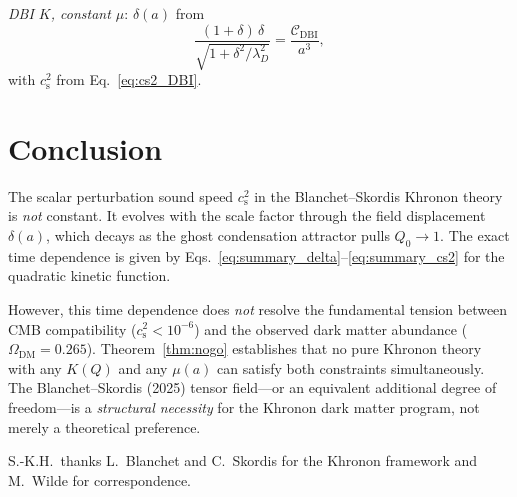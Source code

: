 \documentclass[prd,twocolumn,superscriptaddress,longbibliography,floatfix]{revtex4-2}
\newcommand{\cs}{c_{\mathrm{s}}}
\begin{document}
\emph{DBI $K$, constant $\mu$}: $\delta(a)$ from
\begin{equation}
\frac{(1{+}\delta)\,\delta}{\sqrt{1+\delta^2/\lambda_D^2}}
= \frac{\mathcal{C}_{\mathrm{DBI}}}{a^3},
\label{eq:summary_delta_DBI}
\end{equation}
with $\cs^2$ from Eq.~\eqref{eq:cs2_DBI}.


\section{Conclusion}
\label{sec:conclusion}

The scalar perturbation sound speed $\cs^2$ in the
Blanchet--Skordis Khronon theory is \emph{not} constant.
It evolves with the scale factor through the field
displacement $\delta(a)$, which decays as the ghost
condensation attractor pulls $Q_0 \to 1$.  The exact
time dependence is given by
Eqs.~\eqref{eq:summary_delta}--\eqref{eq:summary_cs2}
for the quadratic kinetic function.

However, this time dependence does \emph{not} resolve
the fundamental tension between CMB compatibility
($\cs^2 < 10^{-6}$) and the observed dark matter
abundance ($\Omega_{\mathrm{DM}} = 0.265$).
Theorem~\ref{thm:nogo} establishes that no pure
Khronon theory with any $K(Q)$ and any $\mu(a)$ can
satisfy both constraints simultaneously.  The
Blanchet--Skordis (2025) tensor field---or an
equivalent additional degree of freedom---is a
\emph{structural necessity} for the Khronon dark
matter program, not merely a theoretical preference.


\begin{acknowledgments}
S.-K.H.\ thanks L.~Blanchet and C.~Skordis for the
Khronon framework and M.~Wilde for correspondence.
\end{acknowledgments}
\end{document}
